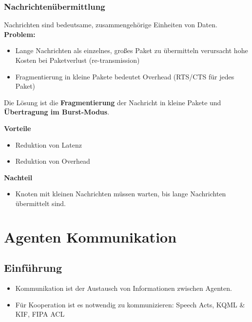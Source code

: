 \documentclass{article} %
\begin{document}
\subsubsection{Nachrichtenübermittlung}
Nachrichten sind bedeutsame, zusammengehörige Einheiten von Daten.
\textbf{Problem:}
\begin{itemize}
	\item Lange Nachrichten als einzelnes, großes Paket zu übermitteln verursacht hohe Kosten bei Paketverlust (re-transmission)
	\item Fragmentierung in kleine Pakete bedeutet Overhead (RTS/CTS für jedes Paket)
\end{itemize}
Die Lösung ist die \textbf{Fragmentierung} der Nachricht in kleine Pakete und \textbf{Übertragung im Burst-Modus}.
\begin{multicols}{2}
	\textbf{Vorteile}
	\begin{itemize}
		\item Reduktion von Latenz
		\item Reduktion von Overhead
	\end{itemize}
	\textbf{Nachteil}
	\begin{itemize}
		\item Knoten mit kleinen Nachrichten müssen warten, bis lange Nachrichten übermittelt sind.
	\end{itemize}
\end{multicols}
\section{Agenten Kommunikation}
	\subsection{Einführung}
	\begin{itemize}
		\item Kommunikation ist der Austausch von Informationen zwischen Agenten.
		\item Für Kooperation ist es notwendig zu kommunizieren: Speech Acts, KQML \& KIF, FIPA ACL
	\end{itemize}
\end{document}
